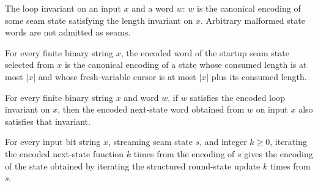 \begin{definition}
\label{Complexity.satStreamInv}
\leanok
{}
The loop invariant on an input $x$ and a word $w$: $w$ is the canonical encoding
of some seam state satisfying the length invariant on $x$. Arbitrary malformed
state words are not admitted as seams.
\end{definition}

\begin{lemma}
\label{Complexity.satStreamInv_start}
\leanok
{}
For every finite binary string $x$, the encoded word of the startup seam state selected
from $x$ is the canonical encoding of a state whose consumed length is at most $|x|$ and
whose fresh-variable cursor is at most $|x|$ plus its consumed length.
\end{lemma}

\begin{lemma}
\label{Complexity.satStreamInv_step}
\leanok
{}
For every finite binary string $x$ and word $w$, if $w$ satisfies the encoded loop
invariant on $x$, then the encoded next-state word obtained from $w$ on input $x$ also
satisfies that invariant.
\end{lemma}

\begin{lemma}
\label{Complexity.satStreamStep_iterate}
\leanok
{}
For every input bit string $x$, streaming seam state $s$, and integer $k\ge 0$,
iterating the encoded next-state function $k$ times from the encoding of $s$ gives the
encoding of the state obtained by iterating the structured round-state update $k$ times
from $s$.
\end{lemma}


